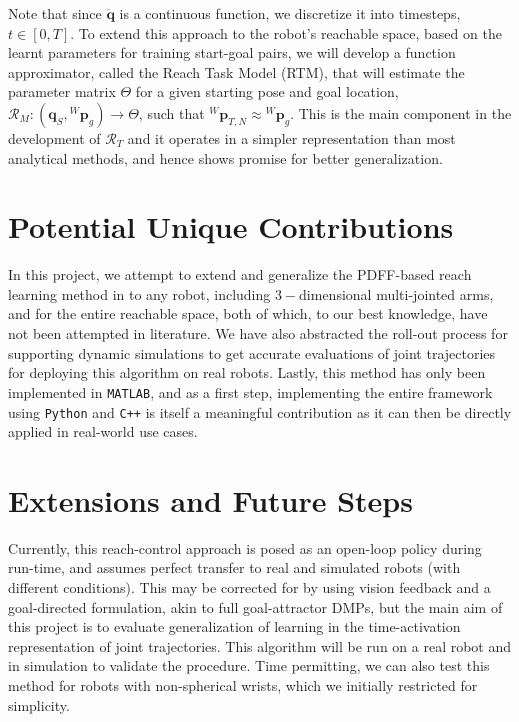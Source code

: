 \documentclass[10pt]{article}
\begin{document}
Note that since $\ddot{\mathbf{q}}$ is a continuous function, we discretize it into timesteps, $t \in [0, T]$. To extend this approach to the robot's reachable space, based on the learnt parameters for training start-goal pairs, we will develop a function approximator, called the Reach Task Model (RTM), that will estimate the parameter matrix $\Theta$ for a given starting pose and goal location, $\mathcal{R}_M: (\mathbf{q}_S, {^W}\mathbf{p}_{g}) \rightarrow \Theta$, such that ${^W}\mathbf{p}_{T,N} \approx {^W}\mathbf{p}_{g}$. This is the main component in the development of $\mathcal{R}_T$ and it operates in a simpler representation than most analytical methods, and hence shows promise for better generalization.

\section{Potential Unique Contributions}
In this project, we attempt to extend and generalize the PDFF-based reach learning method in \cite{pdff} to any robot, including $3-$dimensional multi-jointed arms, and for the entire reachable space, both of which, to our best knowledge, have not been attempted in literature. We have also abstracted the roll-out process for supporting dynamic simulations to get accurate evaluations of joint trajectories for deploying this algorithm on real robots. Lastly, this method has only been implemented in \texttt{MATLAB}, and as a first step, implementing the entire framework using \texttt{Python} and \texttt{C++} is itself a meaningful contribution as it can then be directly applied in real-world use cases.

\section{Extensions and Future Steps}
Currently, this reach-control approach is posed as an open-loop policy during run-time, and assumes perfect transfer to real and simulated robots (with different conditions). This may be corrected for by using vision feedback and a goal-directed formulation, akin to full goal-attractor DMPs, but the main aim of this project is to evaluate generalization of learning in the time-activation representation of joint trajectories. This algorithm will be run on a real robot and in simulation to validate the procedure. Time permitting, we can also test this method for robots with non-spherical wrists, which we initially restricted for simplicity.
\end{document}
